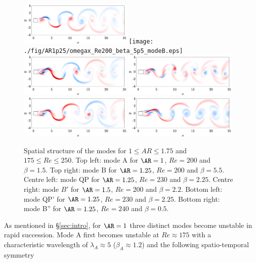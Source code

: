 %
\begin{figure}
  \centering
  \includegraphics[width=0.49\textwidth]{./fig/AR1/omegax_Re200_beta_1p5_modeA.eps}
  \texttt{[image: ./fig/AR1p25/omegax\_Re200\_beta\_5p5\_modeB.eps]}
  \includegraphics[width=0.49\textwidth]{./fig/AR1p25/omegax_Re230_beta_2p25_modeC.eps}
  \includegraphics[width=0.49\textwidth]{./fig/AR1p5/omegax_Re200_beta_2p2_modeBp.eps}
  \includegraphics[width=0.49\textwidth]{./fig/AR1p25/omegax_Re230_beta_2p25_modeD.eps}
  \includegraphics[width=0.49\textwidth]{./fig/AR1p25/omegax_Re240_beta_0p5_modeBpp.eps}
  \caption{Spatial structure of the modes for $1 \le AR \le 1.75$ and $175 \le Re \le 250$. Top left: mode A for $\AR=1$, $Re=200$ and $\beta=1.5$. Top right: mode B for $\AR=1.25$, $Re=200$ and $\beta=5.5$. Centre left: mode QP for $\AR=1.25$, $Re=230$ and $\beta = 2.25$. Centre right: mode $B'$ for $\AR=1.5$, $Re=200$ and $\beta=2.2$. Bottom left: mode QP' for $\AR=1.25$, $Re=230$ and $\beta=2.25$. Bottom right: mode B'' for $\AR=1.25$, $Re=240$ and $\beta=0.5$.}
  \label{fig:modes}
\end{figure}
%
As mentioned in \S\ref{sec:intro}, for $\AR=1$ three distinct modes become unstable in rapid succession. Mode A first becomes unstable at $Re \approx 175$ with a characteristic wavelength of $\lambda_A \approx 5$ ($\beta_A \approx 1.2$) and the following spatio-temporal symmetry 
